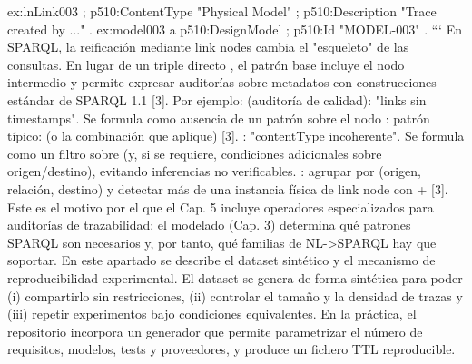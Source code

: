 {}ex:lnLink003 ; p510:ContentType "Physical Model" ; p510:Description "Trace created by ..." .\markdownRendererInterblockSeparator
{}ex:model\markdownRendererUnderscore{}003 a p510:DesignModel ; p510:Id "MODEL-003" . ```\markdownRendererInterblockSeparator
{} En SPARQL, la reificación mediante link nodes cambia el "esqueleto" de las consultas. En lugar de un triple directo , el patrón base incluye el nodo intermedio y permite expresar auditorías sobre metadatos con construcciones estándar de SPARQL 1.1 [3]. Por ejemplo:\markdownRendererInterblockSeparator
{}\markdownRendererUlBeginTight
\markdownRendererUlItem {} (auditoría de calidad): "links sin timestamps". Se formula como ausencia de un patrón sobre el nodo :\markdownRendererInterblockSeparator
{}\markdownRendererUlBeginTight
\markdownRendererUlItem patrón típico:  (o la combinación que aplique) [3].\markdownRendererUlItemEnd 
\markdownRendererUlEndTight \markdownRendererUlItemEnd 
\markdownRendererUlItem {}: "contentType incoherente". Se formula como un filtro sobre  (y, si se requiere, condiciones adicionales sobre origen/destino), evitando inferencias no verificables.\markdownRendererUlItemEnd 
\markdownRendererUlItem {}: agrupar por (origen, relación, destino) y detectar más de una instancia física de link node con  +  [3].\markdownRendererUlItemEnd 
\markdownRendererUlEndTight \markdownRendererInterblockSeparator
{}Este es el motivo por el que el Cap. 5 incluye operadores especializados para auditorías de trazabilidad: el modelado (Cap. 3) determina qué patrones SPARQL son necesarios y, por tanto, qué familias de NL->SPARQL hay que soportar.\markdownRendererInterblockSeparator
{}\markdownRendererInterblockSeparator
{}En este apartado se describe el dataset sintético y el mecanismo de reproducibilidad experimental. El dataset se genera de forma sintética para poder (i) compartirlo sin restricciones, (ii) controlar el tamaño y la densidad de trazas y (iii) repetir experimentos bajo condiciones equivalentes. En la práctica, el repositorio incorpora un generador que permite parametrizar el número de requisitos, modelos, tests y proveedores, y produce un fichero TTL reproducible.\markdownRendererInterblockSeparator
